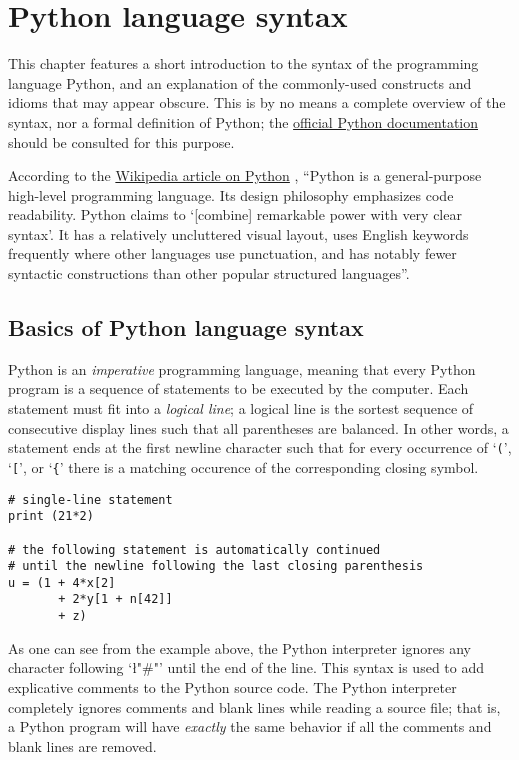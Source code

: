 
\chapter{Python language syntax}
\label{chap:python}

This chapter features a short introduction to the syntax of the
programming language Python, and an explanation of the commonly-used
constructs and idioms that may appear obscure.  This is by no means a
complete overview of the syntax, nor a formal definition of Python;
the \href{http://docs.python.org/3.1/}{official Python documentation}
\cite{python:docs, python:reference} should be consulted for this
purpose.

According to the
\href{http://en.wikipedia.org/wiki/Python_(programming_language)}
{Wikipedia article on Python} \cite{wikipedia:python}, ``Python is a
general-purpose high-level programming language. Its design philosophy
emphasizes code readability. Python claims to `[combine] remarkable
power with very clear syntax'. It has a relatively uncluttered visual
layout, uses English keywords frequently where other languages use
punctuation, and has notably fewer syntactic constructions than other
popular structured languages''.


\section{Basics of Python language syntax}
\label{sec:syntax}

Python is an \emph{imperative} programming language, meaning that
every Python program is a sequence of statements to be executed by the
computer.  Each statement must fit into a \emph{logical line}; a
logical line is the sortest sequence of consecutive display lines such
that all parentheses are balanced.  In other words, a statement ends
at the first newline character such that for every occurrence of
`\verb"("', `\verb"["', or `\verb"{"' there is a matching occurence of
  the corresponding closing symbol.
\begin{lstlisting}
# single-line statement
print (21*2)

# the following statement is automatically continued
# until the newline following the last closing parenthesis
u = (1 + 4*x[2] 
       + 2*y[1 + n[42]]
       + z)
\end{lstlisting}
As one can see from the example above, the Python interpreter ignores
any character following `\l"#"' until the end of the line.  This
syntax is used to add explicative comments to the Python source code.
The Python interpreter completely ignores comments and blank lines
while reading a source file; that is, a Python program will have
\emph{exactly} the same behavior if all the comments and blank lines
are removed.


